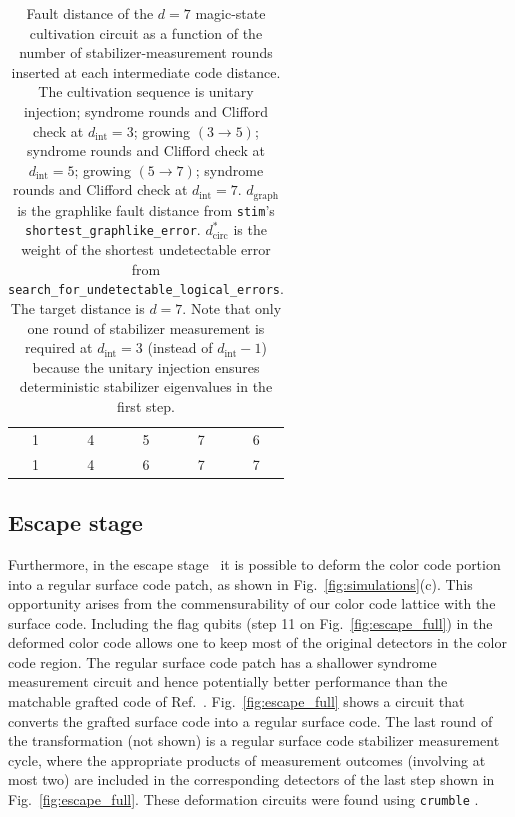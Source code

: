 \begin{table}[h]
\begin{tabular}{ccc|cc}
1 & 4 & 5 & 7 & 6 \\
1 & 4 & 6 & 7 & 7 \\
\hline
\hline
\end{tabular}
\caption{%
  Fault distance of the $d=7$ magic-state cultivation circuit as a function of
  the number of stabilizer-measurement rounds inserted at each intermediate
  code distance.
  The cultivation sequence is
  unitary injection;
  syndrome rounds and Clifford check at $d_\mathrm{int}=3$;
  growing $(3{\to}5)$;
  syndrome rounds and Clifford check at $d_\mathrm{int}=5$;
  growing $(5{\to}7)$;
  syndrome rounds and Clifford check at $d_\mathrm{int}=7$.  $d_\mathrm{graph}$ is the graphlike fault distance from \texttt{stim}'s
  \texttt{shortest\_graphlike\_error}.
  $d_\mathrm{circ}^*$ is the weight of the shortest undetectable error from \texttt{search\_for\_undetectable\_logical\_errors}. The target distance is $d=7$. Note that only one round of stabilizer measurement is required at $d_\text{int} = 3$ (instead of $d_\text{int}-1$) because the unitary injection ensures deterministic stabilizer eigenvalues in the first step.
}
\label{tab:distance}
\end{table}


\subsection{Escape stage}

Furthermore, in the escape stage~\cite{gidneyMagicStateCultivation2024} it is possible to deform the color code portion into a regular surface code patch, as shown in Fig.~\ref{fig:simulations}(c). This opportunity arises from the commensurability of our color code lattice with the surface code. Including the flag qubits (step 11 on Fig.~\ref{fig:escape_full}) in the deformed color code allows one to keep most of the original detectors in the color code region. The regular surface code patch has a shallower syndrome measurement circuit and hence potentially better performance than the matchable grafted code of Ref.~\cite{gidneyMagicStateCultivation2024}. Fig.~\ref{fig:escape_full} shows a circuit that converts the grafted surface code into a regular surface code. The last round of the transformation (not shown) is a regular surface code stabilizer measurement cycle, where the appropriate products of measurement outcomes (involving at most two) are included in the corresponding detectors of the last step shown in Fig.~\ref{fig:escape_full}. These deformation circuits were found using \texttt{crumble} \cite{gidney_stim_2021}.

